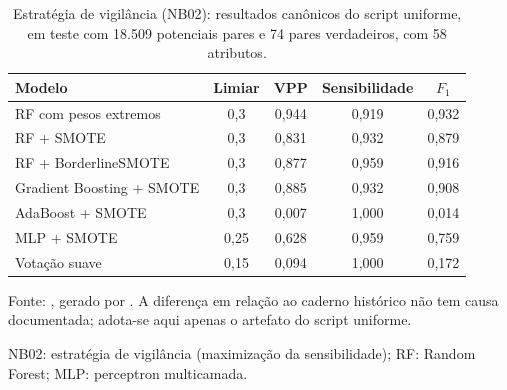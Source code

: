 \begin{table}[htbp]
\centering
\caption{Estratégia de vigilância (NB02): resultados canônicos do script uniforme, em teste com 18.509 potenciais pares e 74 pares verdadeiros, com 58 atributos.}
\label{tab:nb02-recall}
\small
\begin{tabular}{lcccc}
\toprule
Modelo & Limiar & VPP & Sensibilidade & $F_1$ \\
\midrule
RF com pesos extremos & 0,3 & 0,944 & 0,919 & 0,932 \\
RF + SMOTE & 0,3 & 0,831 & 0,932 & 0,879 \\
RF + BorderlineSMOTE & 0,3 & 0,877 & 0,959 & 0,916 \\
Gradient Boosting + SMOTE & 0,3 & 0,885 & 0,932 & 0,908 \\
AdaBoost + SMOTE & 0,3 & 0,007 & 1,000 & 0,014 \\
MLP + SMOTE & 0,25 & 0,628 & 0,959 & 0,759 \\
Votação suave & 0,15 & 0,094 & 1,000 & 0,172 \\
\bottomrule
\end{tabular}
\par\footnotesize Fonte: , gerado por . A diferença em relação ao caderno histórico não tem causa documentada; adota-se aqui apenas o artefato do script uniforme.
\par\footnotesize NB02: estratégia de vigilância (maximização da sensibilidade); RF: Random Forest; MLP: perceptron multicamada.
\end{table}
